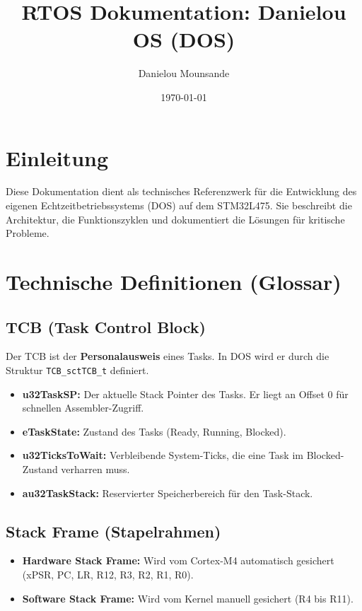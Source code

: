 \documentclass[11pt,a4paper]{article}
\title{RTOS Dokumentation: Danielou OS (DOS)}
\author{Danielou Mounsande}
\date{\today}
\begin{document}
\maketitle
\tableofcontents
\newpage

\section{Einleitung}
Diese Dokumentation dient als technisches Referenzwerk für die Entwicklung des eigenen Echtzeitbetriebssystems (DOS) auf dem STM32L475. Sie beschreibt die Architektur, die Funktionszyklen und dokumentiert die Lösungen für kritische Probleme.

\section{Technische Definitionen (Glossar)}

\subsection{TCB (Task Control Block)}
Der TCB ist der \textbf{Personalausweis} eines Tasks. In DOS wird er durch die Struktur \texttt{TCB\_sctTCB\_t} definiert.
\begin{itemize}
    \item \textbf{u32TaskSP:} Der aktuelle Stack Pointer des Tasks. Er liegt an Offset 0 für schnellen Assembler-Zugriff.
    \item \textbf{eTaskState:} Zustand des Tasks (Ready, Running, Blocked).
    \item \textbf{u32TicksToWait:} Verbleibende System-Ticks, die eine Task im Blocked-Zustand verharren muss.
    \item \textbf{au32TaskStack:} Reservierter Speicherbereich für den Task-Stack.
\end{itemize}

\subsection{Stack Frame (Stapelrahmen)}
\begin{itemize}
    \item \textbf{Hardware Stack Frame:} Wird vom Cortex-M4 automatisch gesichert (xPSR, PC, LR, R12, R3, R2, R1, R0).
    \item \textbf{Software Stack Frame:} Wird vom Kernel manuell gesichert (R4 bis R11).
\end{itemize}
\end{document}

